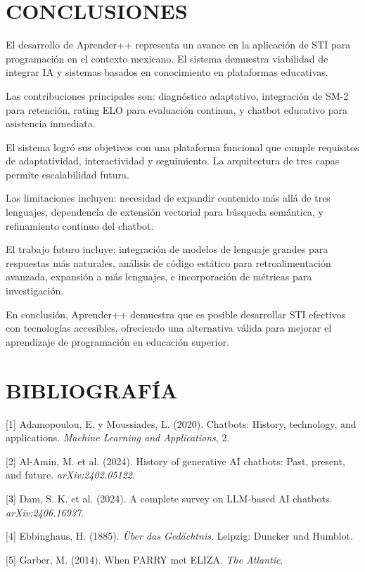 \documentclass[12pt,letterpaper]{article}
\begin{document}
\section{CONCLUSIONES}

El desarrollo de Aprender++ representa un avance en la aplicación de STI para programación en el contexto mexicano. El sistema demuestra viabilidad de integrar IA y sistemas basados en conocimiento en plataformas educativas.

Las contribuciones principales son: diagnóstico adaptativo, integración de SM-2 para retención, rating ELO para evaluación continua, y chatbot educativo para asistencia inmediata.

El sistema logró sus objetivos con una plataforma funcional que cumple requisitos de adaptatividad, interactividad y seguimiento. La arquitectura de tres capas permite escalabilidad futura.

Las limitaciones incluyen: necesidad de expandir contenido más allá de tres lenguajes, dependencia de extensión vectorial para búsqueda semántica, y refinamiento continuo del chatbot.

El trabajo futuro incluye: integración de modelos de lenguaje grandes para respuestas más naturales, análisis de código estático para retroalimentación avanzada, expansión a más lenguajes, e incorporación de métricas para investigación.

En conclusión, Aprender++ demuestra que es posible desarrollar STI efectivos con tecnologías accesibles, ofreciendo una alternativa válida para mejorar el aprendizaje de programación en educación superior.

\newpage
\section{BIBLIOGRAFÍA}

[1] Adamopoulou, E. y Moussiades, L. (2020). Chatbots: History, technology, and applications. \textit{Machine Learning and Applications}, 2.

[2] Al-Amin, M. et al. (2024). History of generative AI chatbots: Past, present, and future. \textit{arXiv:2402.05122}.

[3] Dam, S. K. et al. (2024). A complete survey on LLM-based AI chatbots. \textit{arXiv:2406.16937}.

[4] Ebbinghaus, H. (1885). \textit{Über das Gedächtnis}. Leipzig: Duncker und Humblot.

[5] Garber, M. (2014). When PARRY met ELIZA. \textit{The Atlantic}.
\end{document}
